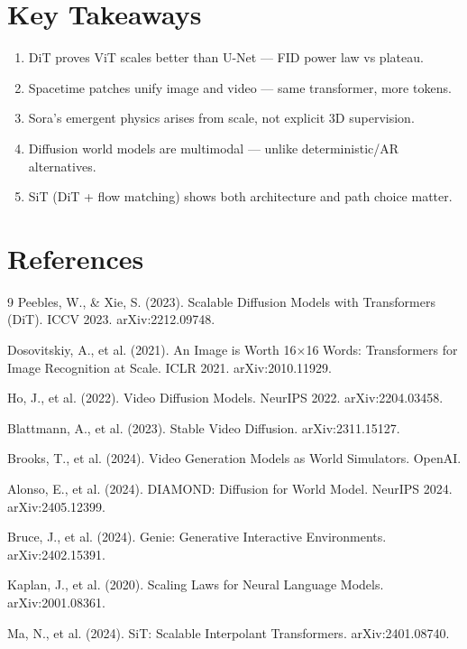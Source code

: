 \documentclass[11pt, a4paper]{article}
\theoremstyle{definition}
\begin{document}
\section{Key Takeaways}

\begin{enumerate}
  \item DiT proves ViT scales better than U-Net — FID power law vs plateau.
  \item Spacetime patches unify image and video — same transformer, more tokens.
  \item Sora's emergent physics arises from scale, not explicit 3D supervision.
  \item Diffusion world models are multimodal — unlike deterministic/AR alternatives.
  \item SiT (DiT + flow matching) shows both architecture and path choice matter.
\end{enumerate}

\section*{References}
\begin{thebibliography}{9}
  Peebles, W., \& Xie, S. (2023). Scalable Diffusion Models with Transformers (DiT).
  ICCV 2023. arXiv:2212.09748.

  Dosovitskiy, A., et al. (2021). An Image is Worth 16×16 Words: Transformers for Image
  Recognition at Scale. ICLR 2021. arXiv:2010.11929.

  Ho, J., et al. (2022). Video Diffusion Models. NeurIPS 2022. arXiv:2204.03458.

  Blattmann, A., et al. (2023). Stable Video Diffusion. arXiv:2311.15127.

  Brooks, T., et al. (2024). Video Generation Models as World Simulators. OpenAI.

  Alonso, E., et al. (2024). DIAMOND: Diffusion for World Model. NeurIPS 2024.
  arXiv:2405.12399.

  Bruce, J., et al. (2024). Genie: Generative Interactive Environments. arXiv:2402.15391.

  Kaplan, J., et al. (2020). Scaling Laws for Neural Language Models. arXiv:2001.08361.

  Ma, N., et al. (2024). SiT: Scalable Interpolant Transformers. arXiv:2401.08740.
\end{thebibliography}
\end{document}
